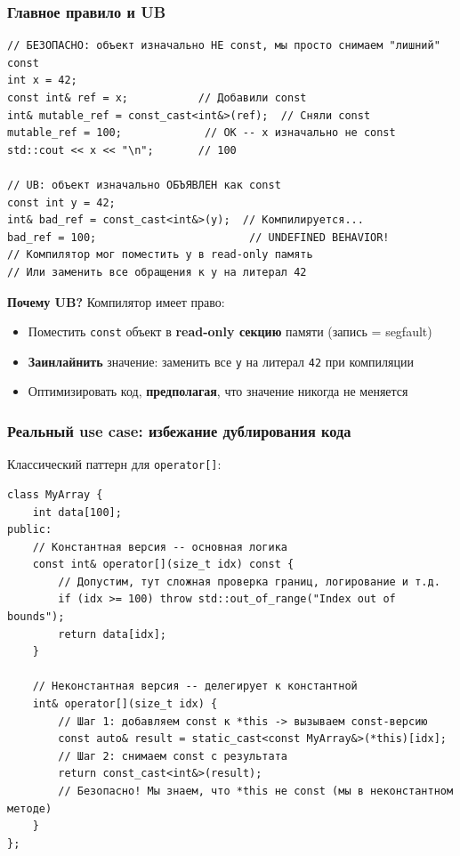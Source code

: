 \documentclass[a4paper,12pt]{article}
\begin{document}
\subsubsection{Главное правило и UB}

\begin{lstlisting}
// БЕЗОПАСНО: объект изначально НЕ const, мы просто снимаем "лишний" const
int x = 42;
const int& ref = x;           // Добавили const
int& mutable_ref = const_cast<int&>(ref);  // Сняли const
mutable_ref = 100;             // OK -- x изначально не const
std::cout << x << "\n";       // 100

// UB: объект изначально ОБЪЯВЛЕН как const
const int y = 42;
int& bad_ref = const_cast<int&>(y);  // Компилируется...
bad_ref = 100;                        // UNDEFINED BEHAVIOR!
// Компилятор мог поместить y в read-only память
// Или заменить все обращения к y на литерал 42
\end{lstlisting}

\textbf{Почему UB?} Компилятор имеет право:
\begin{itemize}
    \item Поместить \texttt{const} объект в \textbf{read-only секцию} памяти
          (запись = segfault)
    \item \textbf{Заинлайнить} значение: заменить все \texttt{y} на литерал \texttt{42}
          при компиляции
    \item Оптимизировать код, \textbf{предполагая}, что значение никогда не меняется
\end{itemize}

\subsubsection{Реальный use case: избежание дублирования кода}

Классический паттерн для \texttt{operator[]}:

\begin{lstlisting}
class MyArray {
    int data[100];
public:
    // Константная версия -- основная логика
    const int& operator[](size_t idx) const {
        // Допустим, тут сложная проверка границ, логирование и т.д.
        if (idx >= 100) throw std::out_of_range("Index out of bounds");
        return data[idx];
    }

    // Неконстантная версия -- делегирует к константной
    int& operator[](size_t idx) {
        // Шаг 1: добавляем const к *this -> вызываем const-версию
        const auto& result = static_cast<const MyArray&>(*this)[idx];
        // Шаг 2: снимаем const с результата
        return const_cast<int&>(result);
        // Безопасно! Мы знаем, что *this не const (мы в неконстантном методе)
    }
};
\end{lstlisting}
\end{document}
